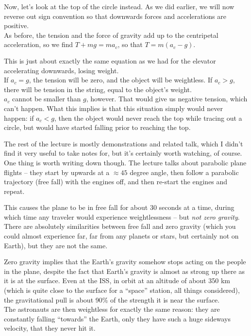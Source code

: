 \documentclass[8.01x]{subfiles}
\begin{document}
Now, let's look at the top of the circle instead. As we did earlier, we will now reverse out sign convention so that downwards forces and accelerations are positive.\\
As before, the tension and the force of gravity add up to the centripetal acceleration, so we find $T + m g = m a_c$, so that $T = m(a_c - g)$.

This is just about exactly the same equation as we had for the elevator accelerating downwards, losing weight.\\
If $a_c = g$, the tension will be zero, and the object will be weightless. If $a_c > g$, there will be tension in the string, equal to the object's weight.\\
$a_c$ cannot be smaller than $g$, however. That would give us negative tension, which can't happen. What this implies is that this situation simply would never happen: if $a_c < g$, then the object would never reach the top while tracing out a circle, but would have started falling prior to reaching the top.

The rest of the lecture is mostly demonstrations and related talk, which I didn't find it very useful to take notes for, but it's certainly worth watching, of course.\\
One thing is worth writing down though. The lecture talks about parabolic plane flights -- they start by upwards at a $\approx 45$ degree angle, then follow a parabolic trajectory (free fall) with the engines off, and then re-start the engines and repeat.

This causes the plane to be in free fall for about 30 seconds at a time, during which time any traveler would experience weightlessness -- but \emph{not zero gravity}. There are absolutely similarities between free fall and zero gravity (which you could almost experience far, far from any planets or stars, but certainly not on Earth), but they are not the same.

Zero gravity implies that the Earth's gravity somehow stops acting on the people in the plane, despite the fact that Earth's gravity is almost as strong up there as it is at the surface. Even at the ISS, in orbit at an altitude of about 350 km (which is quite close to the surface for a ``space'' station, all things considered), the gravitational pull is about 90\% of the strength it is near the surface.\\
The astronauts are then weightless for exactly the same reason: they are constantly falling ``towards'' the Earth, only they have such a huge sideways velocity, that they never hit it.
\end{document}
